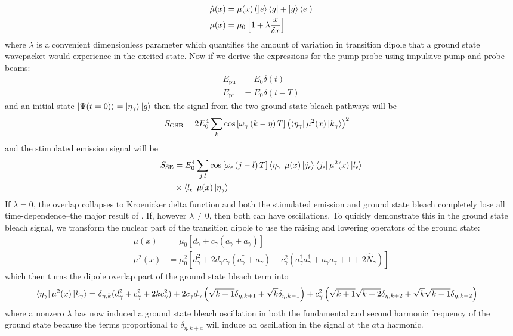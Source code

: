 \begin{align}
	\hat{\mu}(x) &= \mu (x)  \left( \ket{e}\bra{g} + \ket{g} \bra{e} \right)\\
	\mu (x) &= \mu_0 \left[ 1 + \lambda \frac{x}{\delta x}  \right]
\end{align}
where $\lambda$ is a convenient dimensionless parameter which quantifies the amount of variation in transition dipole that a ground state wavepacket would experience in the excited state.  Now if we derive the expressions for the pump-probe using impulsive pump and probe beams:
\begin{align}
	E_{\text{pu}} &= E_0 \delta(t) \\
	E_{\text{pr}} &= E_0 \delta(t - T)
\end{align}
and an initial state $\ket{\Psi (t=0)} = \ket{\eta_{\gamma}} \ket{g}$ then the signal from the two ground state bleach pathways will be
\begin{align}
	S_{\text{GSB}} &=  2 E_0^4 \sum_{k}   \cos \left[  \omega_{\gamma}  \left(   k - \eta \right) T \right]  \left(  \bra{\eta_{\gamma}}  \mu^2 (x) \ket{k_{\gamma}} \right)^2
\end{align}
and the stimulated emission signal will be
\begin{align}
	S_{\text{SE}} &= E_0^4 \sum_{j, l}   \cos  \left[\omega_{\epsilon}  \left(   j - l \right) T \right]   \bra{\eta_{\gamma}}  \mu (x) \ket{j_{\epsilon}} \bra{j_{\epsilon}}  \mu^2 (x) \ket{l_{\epsilon}}\\
   &\times \bra{l_{\epsilon}}  \mu (x) \ket{\eta_{\gamma}}
\end{align}
If $\lambda=0$, the overlap collapses to Kroenicker delta function and both the stimulated emission and ground state bleach completely lose all time-dependence--the major result of .  If, however $\lambda \neq 0$, then both can have oscillations.  To quickly demonstrate this in the ground state bleach signal, we transform the nuclear part of the transition dipole to use the raising and lowering operators of the ground state:
\begin{align}
	\mu (x) &= \mu_0 \left[ d_{\gamma} + c_{\gamma} \left(  a^{\dagger}_{\gamma} + a_{\gamma}\right) \right] \\
	\mu^2(x) &=  \mu_0^2 \left[  d_{\gamma}^2 + 2 d_{\gamma} c_{\gamma} \left( a_{\gamma}^{\dagger} + a_{\gamma}  \right)  + c_{\gamma}^2 \left( a_{\gamma}^{\dagger} a_{\gamma}^{\dagger}  + a_{\gamma}a_{\gamma} + 1 + 2\hat{N}_{\gamma}  \right)\right]
\end{align}
which then turns the dipole overlap part of the ground state bleach term into
\begin{align}
	  \bra{\eta_{\gamma}}  \mu^2 (x) \ket{k_{\gamma}} &= \delta_{\eta,k} (d^2_{\gamma} + c_{\gamma}^2 + 2kc_{\gamma}^2) + 2c_{\gamma} d_{\gamma} \left( \sqrt{k+1} \delta_{\eta, k+1} + \sqrt{k}\delta_{\eta, k-1} \right)  +c_{\gamma}^2 \left( \sqrt{k+1} \sqrt{k+2} \delta_{\eta, k+2} + \sqrt{k}\sqrt{k-1}\delta_{\eta, k-2} \right)
\end{align}
where a nonzero $\lambda$ has now induced a ground state bleach oscillation in both the fundamental and second harmonic frequency of the ground state because the terms proportional to $\delta_{\eta, k + a}$ will induce an oscillation in the signal at the $a$th harmonic.
